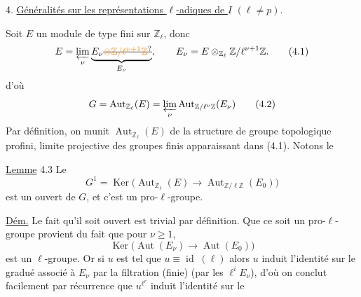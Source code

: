 4. \uline{Généralités sur les représentations $\ell$-adiques de $I$} $(\ell\ne p)$.

Soit $E$ un module de type fini sur $\mathbb Z_\ell$, donc
\[
E=\varprojlim_\nu \underbrace{E_\nu\deleted{\unsure{\otimes\mathbb Z/\ell^{\nu+1}\mathbb Z}}}_{E_\nu},\qquad E_\nu=E\otimes_{\mathbb Z_\ell}\mathbb Z/\ell^{\nu+1}\mathbb Z.
\tag*{(4.1)}
\]
d'où
\[
G=\operatorname{Aut}_{\mathbb Z_\ell}(E)=\varprojlim_\nu\operatorname{Aut}_{\mathbb Z/\ell^\nu\mathbb Z}(E_\nu)
\tag*{(4.2)}
\]
Par définition, on munit $\operatorname{Aut}_{\mathbb Z_\ell}(E)$ de la structure de groupe topologique profini, limite projective des groupes finis apparaissant dans (4.1). Notons le

\uline{Lemme} 4.3 Le  
\[
G^1=\operatorname{Ker}\bigl(\operatorname{Aut}_{\mathbb Z_\ell}(E)\longrightarrow\operatorname{Aut}_{\mathbb Z/\ell\mathbb Z}(E_0)\bigr)
\]
est un  ouvert de $G$,  et c'est un pro-$\ell$-groupe.

\uline{Dém.} Le fait qu'il soit ouvert est trivial par définition. Que ce soit un pro-$\ell$-groupe  provient du fait que pour $\nu\geq 1$,
\[
\operatorname{Ker}\bigl(\operatorname{Aut}(E_\nu)\longrightarrow\operatorname{Aut}(E_0)\bigr)
\]
est un $\ell$-groupe. Or si $u$ est tel que $u\equiv\operatorname{id}\;(\ell)$  alors $u$ induit l'identité sur le gradué associé à $E_\nu$ par la filtration (finie)  (par les $\ell^iE_\nu$), d'où on conclut facilement par récurrence  que $u^{\ell^r}$ induit l'identité sur le

